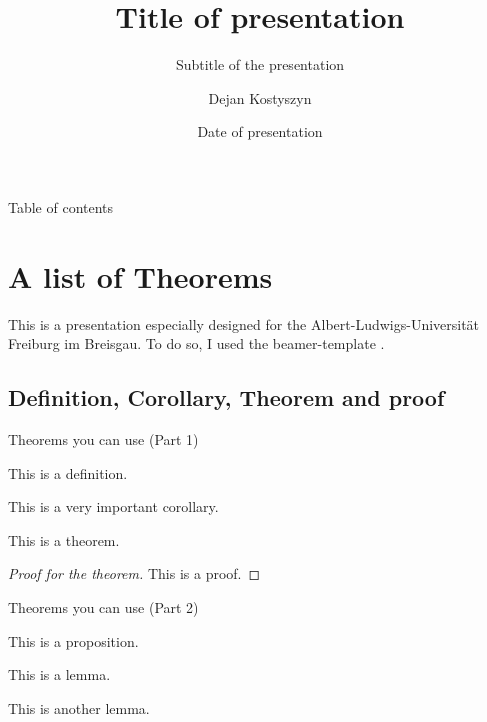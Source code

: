


\author[Kostyszyn]{Dejan Kostyszyn}
\date{Date of presentation}
\title{Title of presentation}
\subtitle{Subtitle of the presentation}


\begin{frame}
	\titlepage
\end{frame}


\begin{frame}{Table of contents}
\tableofcontents[sectionstyle=show/show]
\end{frame}


\section[Theorems]{A list of Theorems}
\begin{frame}
	This is a presentation especially designed for the Albert-Ludwigs-Universität Freiburg im Breisgau. To do so, I used the beamer-template \cite{ctan_beamer}.
\end{frame}


\subsection[Def., Cor., Thm., Proof]{Definition, Corollary, Theorem and proof}
\begin{frame}{Theorems you can use (Part 1)}
	\begin{definition}[A definition]
		This is a definition.
	\end{definition}
	\begin{corollary}
		This is a \alert{very important} corollary.
	\end{corollary}
    \begin{theorem}[A theorem]
    	This is a theorem.
    \end{theorem}
    \begin{proof}[Proof for the theorem]
    	This is a proof.
    \end{proof}
\end{frame}


\begin{frame}{Theorems you can use (Part 2)}
	\begin{proposition}[A proposition]
		This is a proposition.
	\end{proposition}
	\begin{lemma}[A lemma]
		This is a lemma.
	\end{lemma}
	\begin{lemma}
		This is another lemma.
	\end{lemma}
\end{frame}


